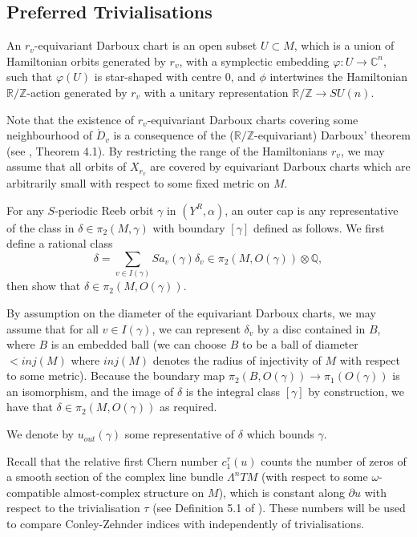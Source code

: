 \documentclass{article}
\numberwithin{equation}{section}
\numberwithin{figure}{section}
\begin{document}
\subsection{Preferred Trivialisations}

\begin{defn}
An $r_v$-equivariant Darboux chart is an open subset $U\subset M$, which is a union of Hamiltonian orbits generated by $r_v$, with a symplectic embedding $\varphi:U\rightarrow \mathbb{C}^n$, such that $\varphi(U)$ is star-shaped with centre $0$, and $\phi$ intertwines the Hamiltonian $\mathbb{R}/\mathbb{Z}$-action generated by $r_v$ with a unitary representation $\mathbb{R}/\mathbb{Z}\rightarrow SU(n)$.    
\end{defn}
Note that the existence of $r_v$-equivariant Darboux charts covering some neighbourhood of $\mathring{D}_v$ is a consequence of the ($\mathbb{R}/\mathbb{Z}$-equivariant) Darboux' theorem (see \cite{GS}, Theorem 4.1). By restricting the range of the Hamiltonians $r_v$, we may assume that all orbits of $X_{r_v}$ are covered by equivariant Darboux charts which are arbitrarily small with respect to some fixed metric on $M$.


\begin{defn}
\label{outer_caps}
For any $S$-periodic Reeb orbit $\gamma$ in $(Y^R,\alpha)$, an outer cap is any representative of the class in $\delta\in\pi_2(M,\gamma)$ with boundary $[\gamma]$ defined as follows. We first define a rational class
\begin{equation}
    \delta=\sum_{v\in I(\gamma)}Sa_v(\gamma)\delta_v\in \pi_2(M,O(\gamma))\otimes\mathbb{Q},
\end{equation}
then show that $\delta\in\pi_2(M,O(\gamma))$.

By assumption on the diameter of the equivariant Darboux charts, we may assume that for all $v\in I(\gamma)$, we can represent $\delta_v$ by a disc contained in $B$, where $B$ is an embedded ball (we can choose $B$ to be a ball of diameter $<inj(M)$ where $inj(M)$ denotes the radius of injectivity of $M$ with respect to some metric). Because the boundary map $\pi_2(B,O(\gamma))\rightarrow \pi_1(O(\gamma))$ is an isomorphism, and the image of $\delta$ is the integral class $[\gamma]$ by construction, we have that $\delta\in\pi_2(M,O(\gamma))$ as required.

We denote by $u_{out}(\gamma)$ some representative of $\delta$ which bounds $\gamma$.
\end{defn}

Recall that the relative first Chern number $c_1^\tau(u)$ counts the number of zeros of a smooth section of the complex line bundle $\Lambda^nTM$ (with respect to some $\omega$-compatible almost-complex structure on $M$), which is constant along $\partial u$ with respect to the trivialisation $\tau$ (see Definition 5.1 of \cite{Wendl}). These numbers will be used to compare Conley-Zehnder indices with independently of trivialisations. 
\end{document}

